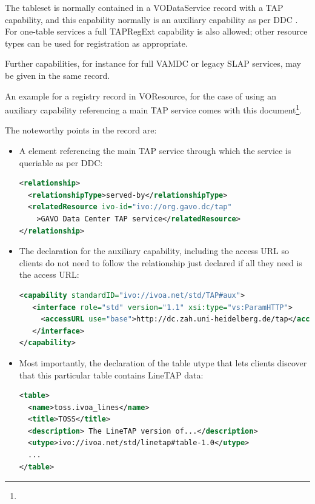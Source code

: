 \documentclass[11pt,a4paper]{ivoa}
\begin{document}
The tableset is normally contained in a VODataService 
record with a TAP capability, and this capability normally is an auxiliary
capability as per DDC \citep{2019ivoa.spec.0520D}.  For one-table
services a full TAPRegExt \citep{2012ivoa.spec.0827D} capability is also
allowed; other resource types can be used for registration as
appropriate.

Further capabilities, for instance for full VAMDC or legacy SLAP
services, may be given in the same record.

An example for a registry record in VOResource, for the case of
using an auxiliary capability referencing a main TAP service comes with
this document\footnote{}.

The noteworthy points in the record are:

\begin{itemize}
\item A  element referencing the main TAP service
through which the service is queriable as per DDC:
\begin{lstlisting}[language=XML,basicstyle=\footnotesize]
<relationship>
  <relationshipType>served-by</relationshipType>
  <relatedResource ivo-id="ivo://org.gavo.dc/tap"
    >GAVO Data Center TAP service</relatedResource>
</relationship>
\end{lstlisting}

\item The declaration for the auxiliary capability, including the access
URL so clients do not need to follow the relationship just declared if
all they need is the access URL:
\begin{lstlisting}[language=XML,basicstyle=\footnotesize]
<capability standardID="ivo://ivoa.net/std/TAP#aux">
   <interface role="std" version="1.1" xsi:type="vs:ParamHTTP">
     <accessURL use="base">http://dc.zah.uni-heidelberg.de/tap</accessURL>
   </interface>
</capability>
\end{lstlisting}

\item Most importantly, the declaration of the table utype that lets
clients discover that this particular table contains LineTAP data:
\begin{lstlisting}[language=XML,basicstyle=\footnotesize]
<table>
  <name>toss.ivoa_lines</name>
  <title>TOSS</title>
  <description> The LineTAP version of...</description>
  <utype>ivo://ivoa.net/std/linetap#table-1.0</utype>
  ...
</table>
\end{lstlisting}
\end{itemize}
\end{document}
